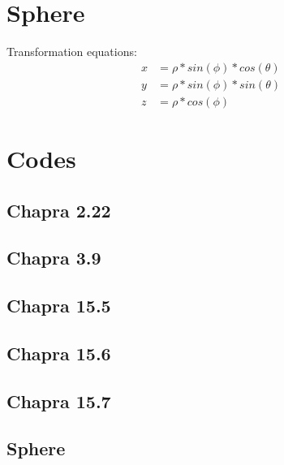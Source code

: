 \documentclass{article}
\begin{document}
\section{Sphere}
Transformation equations:
\begin{align*}
x&=\rho * sin(\phi)*cos(\theta)\\
y&=\rho * sin(\phi)*sin(\theta)\\
z&=\rho * cos(\phi)
\end{align*}
\pagebreak

\appendix
\section{Codes}



\lstset{style=python103, language=python} 

\subsection{Chapra 2.22}

\pagebreak

\subsection{Chapra 3.9}

\pagebreak

\subsection{Chapra 15.5}

\pagebreak

\subsection{Chapra 15.6}

\pagebreak

\subsection{Chapra 15.7}

\pagebreak

\subsection{Sphere}

\end{document}
